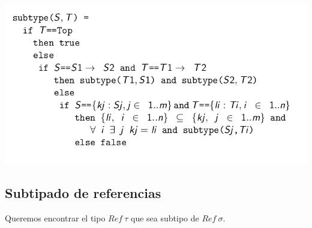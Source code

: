 \includegraphics[scale=0.4]{imagenes/algoritmo_subtipado.png}

\subsection{Subtipado de referencias}
Queremos encontrar el tipo $Ref~\tau$ que sea subtipo de $Ref~\sigma$. 
